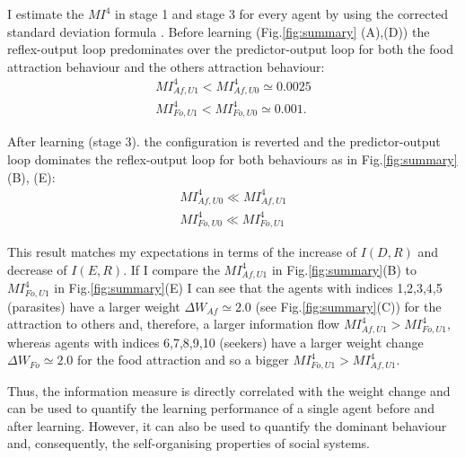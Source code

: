 I estimate the $MI^4$ in stage 1 and stage 3 for every agent by using the corrected
 standard deviation formula \citep{Rouslton}. Before learning (Fig.\ref{fig:summary} (A),(D))
the reflex-output loop predominates over the predictor-output loop for both the
food attraction behaviour and the others attraction behaviour:
\begin{eqnarray}
MI^4_{Af,U1}<MI^4_{Af,U0} \simeq 0.0025\\
MI^4_{Fo,U1}<MI^4_{Fo,U0}\simeq 0.001.
\end{eqnarray}

After learning (stage 3). the configuration is reverted and the predictor-output
loop dominates the reflex-output loop for both behaviours as in
Fig.\ref{fig:summary}(B), (E):
\begin{eqnarray}
MI^4_{Af,U0}\ll MI^4_{Af,U1}\\
MI^4_{Fo,U0} \ll MI^4_{Fo,U1}
\end{eqnarray}

This result matches my expectations in terms of the increase of $I(D,R)$ and
decrease of $I(E,R)$.
If I compare the $MI^4_{Af,U1}$ in Fig.\ref{fig:summary}(B) to $MI^4_{Fo,U1}$
in Fig.\ref{fig:summary}(E) I can see that the agents with indices 1,2,3,4,5
(parasites) have a larger weight $\Delta W_{Af}\simeq 2.0$ (see Fig.\ref{fig:summary}(C))
for the attraction to others and, therefore, a larger information flow
$MI^4_{Af,U1}>MI^4_{Fo,U1}$, whereas agents with indices 6,7,8,9,10 (seekers)
 have a larger weight change $\Delta W_{Fo}\simeq 2.0$ for the food attraction
and so a bigger $MI^4_{Fo,U1}>MI^4_{Af,U1}$.

Thus, the information measure is directly correlated with the weight change and
can be used to quantify the learning performance of a single agent before and
after learning. However, it can also be used to quantify the dominant behaviour
and, consequently, the self-organising properties of social systems.


